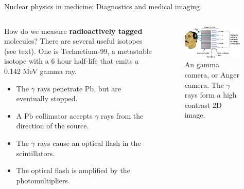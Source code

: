 \documentclass{beamer}
\begin{document}
\begin{frame}{Nuclear physics in medicine: Diagnostics and medical imaging}
\begin{columns}[T]
\begin{column}{0.5\textwidth}
\footnotesize
How do we measure \textbf{\alert{radioactively tagged}} molecules?  There are several useful isotopes (see text).  One is Technetium-99, a metastable isotope with a 6 hour half-life that emits a 0.142 MeV gamma ray.
\begin{itemize}
\item The $\gamma$ rays penetrate Pb, but are eventually stopped.
\item A Pb collimator accepts $\gamma$ rays from the direction of the source.
\item The $\gamma$ rays cause an optical flash in the scintillators.
\item The optical flash is amplified by the photomultipliers.
\end{itemize}
\end{column}
\begin{column}{0.5\textwidth}
\begin{figure}
\centering
\includegraphics[width=0.95\textwidth]{figures/anger_camera.png}
\caption{\label{fig:medicine_1} An gamma camera, or Anger camera.  The $\gamma$ rays form a high contrast 2D image.}
\end{figure}
\end{column}
\end{columns}
\end{frame}
\end{document}
